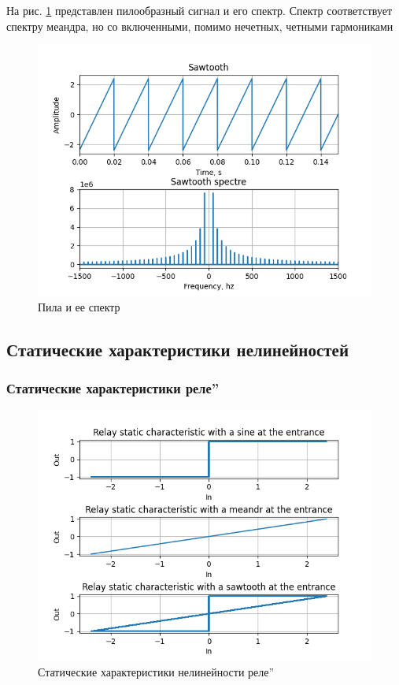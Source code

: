 На рис. \ref{fig:9} представлен пилообразный сигнал и его спектр.
Спектр соответствует спектру меандра, но со включенными, помимо нечетных, четными гармониками

\begin{figure}[H]
	\centering
	\includegraphics[width=0.7\linewidth]{body/images/sawtooth-and-its-spectre.png}
	\caption{Пила и ее спектр}
	\label{fig:9}
\end{figure}

\subsection{Статические характеристики нелинейностей}


\subsubsection{Статические характеристики  реле\textquotedblright}

\begin{figure}[H]
	\centering
	\includegraphics[width=0.7\linewidth]{body/images/relay-static-characteristics.png}
	\caption{Статические характеристики нелинейности  реле\textquotedblright}
	\label{fig:10}
\end{figure}

